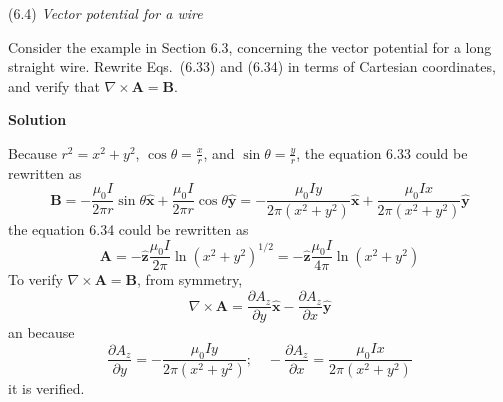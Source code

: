 \documentclass{article}
\begin{document}
\maketitle
\newpage





\begin{homeworkProblem}
	(6.4) \textit{Vector potential for a wire}

	Consider the example in Section 6.3, concerning the vector potential for a long straight wire. Rewrite Eqs.~(6.33) and (6.34) in terms of Cartesian coordinates, and verify that $\nabla\times\mathbf{A}=\mathbf{B}$.

	\textbf{Solution}

	Because $r^2=x^2+y^2$, $\cos\theta=\frac{x}{r}$, and $\sin\theta=\frac{y}{r}$, the equation 6.33 could be rewritten as 
	\[
		\mathbf{B}=-\frac{\mu_0 I}{2\pi r}\sin\theta\hat{\mathbf{x}}+\frac{\mu_0 I}{2\pi r}\cos\theta\hat{\mathbf{y}}=-\frac{\mu_0 Iy}{2\pi(x^2+y^2)}\hat{\mathbf{x}}+\frac{\mu_0 Ix}{2\pi(x^2+y^2)}\hat{\mathbf{y}}
	\]
	the equation 6.34 could be rewritten as
	\[
		\mathbf{A}=-\hat{\mathbf{z}}\frac{\mu_0 I}{2\pi}\ln(x^2+y^2)^{1/2}=-\hat{\mathbf{z}}\frac{\mu_0 I}{4\pi}\ln(x^2+y^2)
	\]
	To verify $\nabla\times\mathbf{A}=\mathbf{B}$, from symmetry,
	\[
		\nabla\times\mathbf{A}=\frac{\partial A_z}{\partial y}\hat{\mathbf{x}}-\frac{\partial A_z}{\partial x}\hat{\mathbf{y}}
	\]
	an because
	\[
		\frac{\partial A_z}{\partial y}=-\frac{\mu_0 Iy}{2\pi(x^2+y^2)};\quad-\frac{\partial A_z}{\partial x}=\frac{\mu_0 Ix}{2\pi(x^2+y^2)}
	\]
	it is verified.
\end{homeworkProblem}

\end{document}
